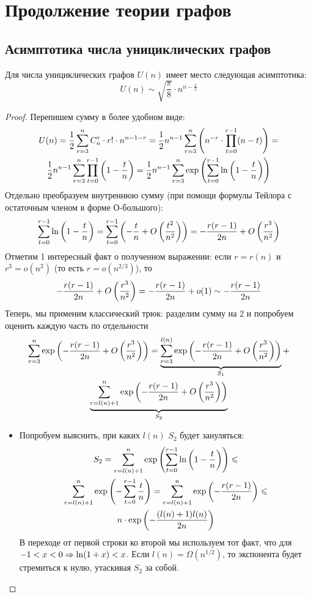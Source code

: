 \section{Продолжение теории графов}

\subsection{Асимптотика числа унициклических графов}

\begin{proposition} \label{asympprop}
	Для числа унициклических графов $U(n)$ имеет место следующая асимптотика:
	\[
		U(n) \sim \sqrt{\frac{\pi}{8}} \cdot n^{n - \frac{1}{2}}
	\]
\end{proposition}

\begin{proof}
	Перепишем сумму в более удобном виде:
	\begin{multline*}
		U(n) = \frac{1}{2} \sum_{r = 3}^n C_n^r \cdot r! \cdot n^{n - 1 - r} = \frac{1}{2} n^{n - 1} \sum_{r = 3}^n \left(n^{-r} \cdot \prod_{t = 0}^ {r - 1} (n - t)\right) =
		\\
		\frac{1}{2} n^{n - 1} \sum_{r = 3}^n \prod_{t = 0}^{r - 1} \left(1 - \frac{t}{n}\right) = \frac{1}{2} n^{n - 1} \sum_{r = 3}^n \exp\left(\sum_{t = 0}^{r - 1} \ln\left(1 - \frac{t}{n}\right)\right)
	\end{multline*}
	Отдельно преобразуем внутреннюю сумму (при помощи формулы Тейлора с остаточным членом в форме О-большого):
	\[
		\sum_{t = 0}^{r - 1} \ln\left(1 - \frac{t}{n}\right) = \sum_{t = 0}^{r - 1} \left(-\frac{t}{n} + O\left(\frac{t^2}{n^2}\right)\right) = -\frac{r(r - 1)}{2n} + O\left(\frac{r^3}{n^2}\right)
	\]
	Отметим 1 интересный факт о полученном выражении: если $r = r(n)$ и $r^3 = o(n^2)$ (то есть $r = o(n^{2/3})$), то
	\[
		-\frac{r(r - 1)}{2n} + O\left(\frac{r^3}{n^2}\right) = -\frac{r(r - 1)}{2n} + o(1) \sim -\frac{r(r - 1)}{2n}
	\]
	Теперь, мы применим классический трюк: разделим сумму на 2 и попробуем оценить каждую часть по отдельности
	\begin{multline*}
		\sum_{r = 3}^n \exp\left(-\frac{r(r - 1)}{2n} + O\left(\frac{r^3}{n^2}\right)\right) = \underbrace{\sum_{r = 3}^{l(n)} \exp\left(-\frac{r(r - 1)}{2n} + O\left(\frac{r^3}{n^2}\right)\right)}_{S_1} +
		\\
		\underbrace{\sum_{r = l(n) + 1}^n \exp\left(-\frac{r(r - 1)}{2n} + O\left(\frac{r^3}{n^2}\right)\right)}_{S_2}
	\end{multline*}
	\begin{itemize}
		\item Попробуем выяснить, при каких $l(n)$ $S_2$ будет зануляться:
		\begin{multline*}
			S_2 = \sum_{r = l(n) + 1}^n \exp\left(\sum_{t = 0}^{r - 1} \ln\left(1 - \frac{t}{n}\right)\right) \leqslant
			\\
			\sum_{r = l(n) + 1}^n \exp\left(-\sum_{t = 0}^{r - 1} \frac{t}{n}\right) = \sum_{r = l(n) + 1}^n \exp\left(-\frac{r(r - 1)}{2n}\right) \leqslant
			\\
			n \cdot \exp\left(-\frac{(l(n) + 1)l(n)}{2n}\right)
		\end{multline*}
		В переходе от первой строки ко второй мы используем тот факт, что для $-1 < x < 0 \Rightarrow \ln(1 + x) < x$. Если $l(n) = \Omega(n^{1/2})$, то экспонента будет стремиться к нулю, утаскивая $S_2$ за собой.
		

\end{itemize}
\end{proof}
